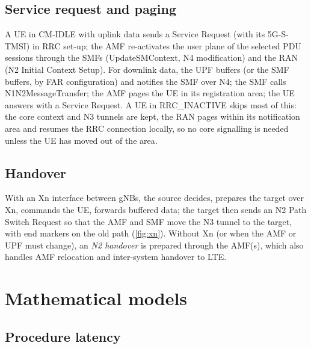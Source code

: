 \documentclass[11pt,a4paper]{article}
\begin{document}
\begin{acnfigure}
  \caption{PDU session establishment (simplified) \cite{ts23502}.}
  \label{fig:pdu}
\end{acnfigure}

\subsection{Service request and paging}
A UE in CM-IDLE with uplink data sends a Service Request (with its 5G-S-TMSI) in RRC set-up; the AMF re-activates the user plane of the
selected PDU sessions through the SMFs (UpdateSMContext, N4 modification) and the RAN (N2 Initial Context Setup). For downlink data, the UPF
buffers (or the SMF buffers, by FAR configuration) and notifies the SMF over N4; the SMF calls N1N2MessageTransfer; the AMF pages the UE in
its registration area; the UE answers with a Service Request. A UE in RRC\_INACTIVE skips most of this: the core context and N3 tunnels are
kept, the RAN pages within its notification area and resumes the RRC connection locally, so no core signalling is needed unless the UE has
moved out of the area.

\subsection{Handover}
With an Xn interface between gNBs, the source decides, prepares the target over Xn, commands the UE, forwards buffered data; the target then
sends an N2 Path Switch Request so that the AMF and SMF move the N3 tunnel to the target, with end markers on the old path (\cref{fig:xn}).
Without Xn (or when the AMF or UPF must change), an \emph{N2 handover} is prepared through the AMF(s), which also handles AMF relocation
and inter-system handover to LTE.

\begin{acnfigure}
  \caption{Xn handover with path switch (simplified).}
  \label{fig:xn}
\end{acnfigure}

\section{Mathematical models}

\subsection{Procedure latency}\label{sec:lat}
\end{document}
